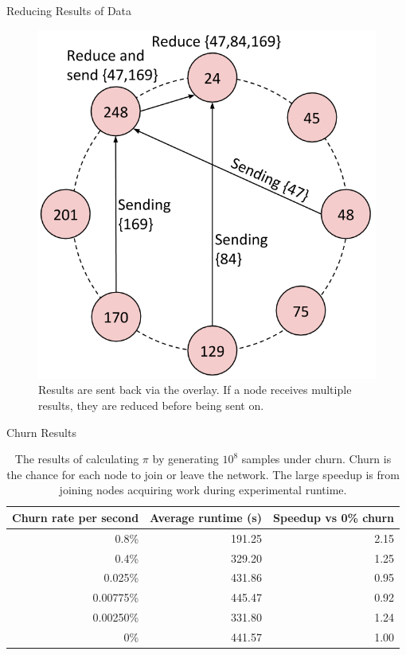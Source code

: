 \documentclass[11pt]{beamer}
\begin{document}
\begin{frame}{Reducing Results of Data}
	\begin{figure}
	    \includegraphics[width=0.50\linewidth]{figs/CR_dataflow3}
	    \caption{Results are sent back via the overlay. If a node receives multiple results, they are reduced before being sent on.}
	\end{figure}
\end{frame}




\begin{frame}{Churn Results}
	\begin{table}
		\centering
		\begin{tabular}{|r|r|r|} 
			\hline 
			Churn rate per second & Average runtime (s) & Speedup vs 0\% churn\\ \hline{}
			0.8\% & 191.25 & 2.15 \\ \hline
			0.4\% & 329.20 & 1.25 \\ \hline
			0.025\% & 431.86 & 0.95 \\ \hline 
			0.00775\%  & 445.47 & 0.92 \\ \hline 
			0.00250\% & 331.80  &  1.24 \\ \hline 
			0\% & 441.57 & 1.00 \\ \hline
		\end{tabular}
		\caption{The results of calculating $\pi$ by generating $10^8$ samples under churn. Churn is the chance for each node to join or leave the network. The large speedup is from joining nodes acquiring work during experimental runtime.} 
		\label{tab:churnSpeed}
	\end{table}
	
\end{frame}
\end{document}
